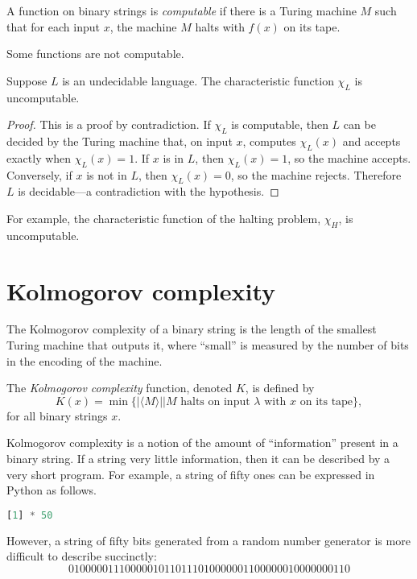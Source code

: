 \begin{definition}
  A function on binary strings is \emph{computable} if there is a Turing machine $M$ such that for each input $x$, the machine $M$ halts with $f(x)$ on its tape.
\end{definition}

Some functions are not computable.

\begin{theorem}
  Suppose $L$ is an undecidable language.
  The characteristic function $\chi_L$ is uncomputable.
\end{theorem}
\begin{proof}
  This is a proof by contradiction.
  If $\chi_L$ is computable, then $L$ can be decided by the Turing machine that, on input $x$, computes $\chi_L(x)$ and accepts exactly when $\chi_L(x) = 1$.
  If $x$ is in $L$, then $\chi_L(x) = 1$, so the machine accepts.
  Conversely, if $x$ is not in $L$, then $\chi_L(x) = 0$, so the machine rejects.
  Therefore $L$ is decidable---a contradiction with the hypothesis.
\end{proof}

For example, the characteristic function of the halting problem, $\chi_H$, is uncomputable.

\section{Kolmogorov complexity}

The Kolmogorov complexity of a binary string is the length of the smallest Turing machine that outputs it, where ``small'' is measured by the number of bits in the encoding of the machine.

\begin{definition}
  The \emph{Kolmogorov complexity} function, denoted $K$, is defined by
  $$
  K(x) = \min \{ |\langle M \rangle| | M \text{ halts on input } \lambda \text{ with } x \text{ on its tape}\},
  $$
  for all binary strings $x$.
\end{definition}

Kolmogorov complexity is a notion of the amount of ``information'' present in a binary string.
If a string very little information, then it can be described by a very short program.
For example, a string of fifty ones can be expressed in Python as follows.
\begin{lstlisting}[language=Python]
  [1] * 50
\end{lstlisting}
However, a string of fifty bits generated from a random number generator is more difficult to describe succinctly:
$$
01000001110000010110111010000001100000010000000110
$$

